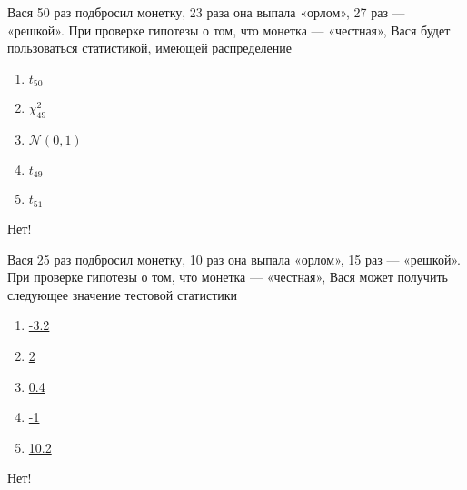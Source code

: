 \documentclass[t]{beamer}
\newcommand{\cN}{\mathcal{N}}
\begin{document}
 \begin{frame} \label{38-No} 
\begin{block}{38} 

Вася 50 раз подбросил монетку, 23 раза она выпала «орлом», 27 раз — «решкой». При проверке гипотезы о том, что монетка — «честная», Вася будет пользоваться статистикой, имеющей распределение


 \end{block} 
\begin{enumerate} 
\item[] \hyperlink{38-No}{\beamergotobutton{} $t_{50}$}
\item[] \hyperlink{38-No}{\beamergotobutton{} $\chi^2_{49}$}
\item[] \hyperlink{38-Yes}{\beamergotobutton{} $\cN(0,1)$}
\item[] \hyperlink{38-No}{\beamergotobutton{} $t_{49}$}
\item[] \hyperlink{38-No}{\beamergotobutton{} $t_{51}$}
\end{enumerate} 

 \alert{Нет!} 
\end{frame} 


 \begin{frame} \label{39-No} 
\begin{block}{39} 

Вася 25 раз подбросил монетку, 10 раз она выпала «орлом», 15 раз — «решкой».
При проверке гипотезы о том, что монетка — «честная»,
Вася может получить следующее значение тестовой статистики


 \end{block} 
\begin{enumerate} 
\item[] \hyperlink{39-No}{\beamergotobutton{} -3.2}
\item[] \hyperlink{39-No}{\beamergotobutton{} 2}
\item[] \hyperlink{39-No}{\beamergotobutton{} 0.4}
\item[] \hyperlink{39-Yes}{\beamergotobutton{} -1}
\item[] \hyperlink{39-No}{\beamergotobutton{} 10.2}
\end{enumerate} 

 \alert{Нет!} 
\end{frame} 
\end{document}
